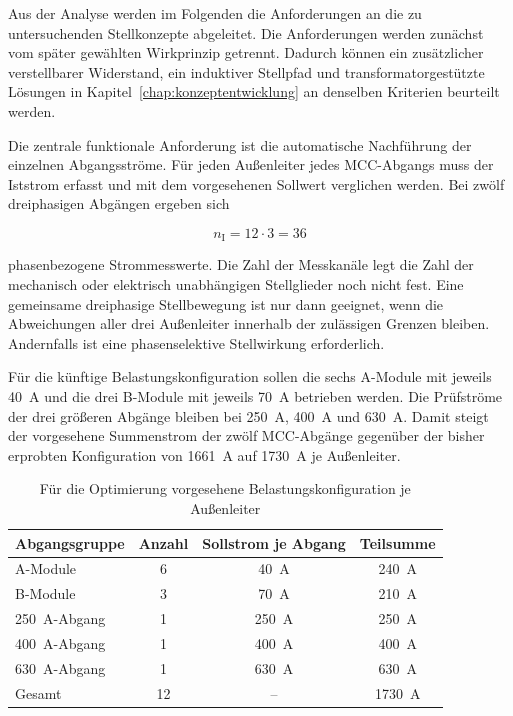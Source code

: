 Aus der Analyse werden im Folgenden die Anforderungen an die zu
untersuchenden Stellkonzepte abgeleitet. Die Anforderungen werden zunächst
vom später gewählten Wirkprinzip getrennt. Dadurch können ein zusätzlicher
verstellbarer Widerstand, ein induktiver Stellpfad und
transformatorgestützte Lösungen in Kapitel~\ref{chap:konzeptentwicklung}
an denselben Kriterien beurteilt werden.

Die zentrale funktionale Anforderung ist die automatische Nachführung der
einzelnen Abgangsströme. Für jeden Außenleiter jedes MCC-Abgangs muss der
Iststrom erfasst und mit dem vorgesehenen Sollwert verglichen werden. Bei
zwölf dreiphasigen Abgängen ergeben sich

\begin{equation}
    n_\mathrm{I}
    =
    12\cdot 3
    =
    36
    \label{eq:anzahl_modulstromkanaele}
\end{equation}

phasenbezogene Strommesswerte. Die Zahl der Messkanäle legt die Zahl der
mechanisch oder elektrisch unabhängigen Stellglieder noch nicht fest. Eine
gemeinsame dreiphasige Stellbewegung ist nur dann geeignet, wenn die
Abweichungen aller drei Außenleiter innerhalb der zulässigen Grenzen bleiben.
Andernfalls ist eine phasenselektive Stellwirkung erforderlich.

Für die künftige Belastungskonfiguration sollen die sechs A-Module mit
jeweils \SI{40}{\ampere} und die drei B-Module mit jeweils
\SI{70}{\ampere} betrieben werden. Die Prüfströme der drei größeren Abgänge
bleiben bei \SI{250}{\ampere}, \SI{400}{\ampere} und
\SI{630}{\ampere}. Damit steigt der vorgesehene Summenstrom der zwölf
MCC-Abgänge gegenüber der bisher erprobten Konfiguration von
\SI{1661}{\ampere} auf \SI{1730}{\ampere} je Außenleiter.

\begin{table}[H]
    \centering
    \caption{Für die Optimierung vorgesehene Belastungskonfiguration je
    Außenleiter}
    \label{tab:mcc_belastungskonfiguration}
    \begin{tabular}{lccc}
        \toprule
        Abgangsgruppe & Anzahl & Sollstrom je Abgang & Teilsumme \\
        \midrule
        A-Module & 6 & \SI{40}{\ampere} & \SI{240}{\ampere} \\
        B-Module & 3 & \SI{70}{\ampere} & \SI{210}{\ampere} \\
        \SI{250}{\ampere}-Abgang & 1 & \SI{250}{\ampere} &
        \SI{250}{\ampere} \\
        \SI{400}{\ampere}-Abgang & 1 & \SI{400}{\ampere} &
        \SI{400}{\ampere} \\
        \SI{630}{\ampere}-Abgang & 1 & \SI{630}{\ampere} &
        \SI{630}{\ampere} \\
        \midrule
        Gesamt & 12 & -- & \SI{1730}{\ampere} \\
        \bottomrule
    \end{tabular}
\end{table}

